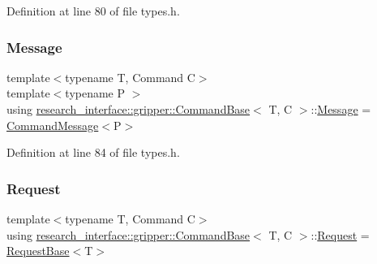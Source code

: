Definition at line 80 of file types.\+h.

\mbox{\label{structresearch__interface_1_1gripper_1_1CommandBase_a7d2de8bd0656d747f712a4a592750efc}} 
\subsubsection{\texorpdfstring{Message}{Message}}
{\footnotesize\ttfamily template$<$typename T, Command C$>$ \\
template$<$typename P $>$ \\
using \hyperlink{structresearch__interface_1_1gripper_1_1CommandBase}{research\+\_\+interface\+::gripper\+::\+Command\+Base}$<$ T, C $>$\+::\hyperlink{structresearch__interface_1_1gripper_1_1CommandBase_a7d2de8bd0656d747f712a4a592750efc}{Message} =  \hyperlink{structresearch__interface_1_1gripper_1_1CommandMessage}{Command\+Message}$<$P$>$}



Definition at line 84 of file types.\+h.

\mbox{\label{structresearch__interface_1_1gripper_1_1CommandBase_ad35751ab24cc9fe83798d890dff1484d}} 
\subsubsection{\texorpdfstring{Request}{Request}}
{\footnotesize\ttfamily template$<$typename T, Command C$>$ \\
using \hyperlink{structresearch__interface_1_1gripper_1_1CommandBase}{research\+\_\+interface\+::gripper\+::\+Command\+Base}$<$ T, C $>$\+::\hyperlink{structresearch__interface_1_1gripper_1_1CommandBase_ad35751ab24cc9fe83798d890dff1484d}{Request} =  \hyperlink{structresearch__interface_1_1gripper_1_1RequestBase}{Request\+Base}$<$T$>$}




